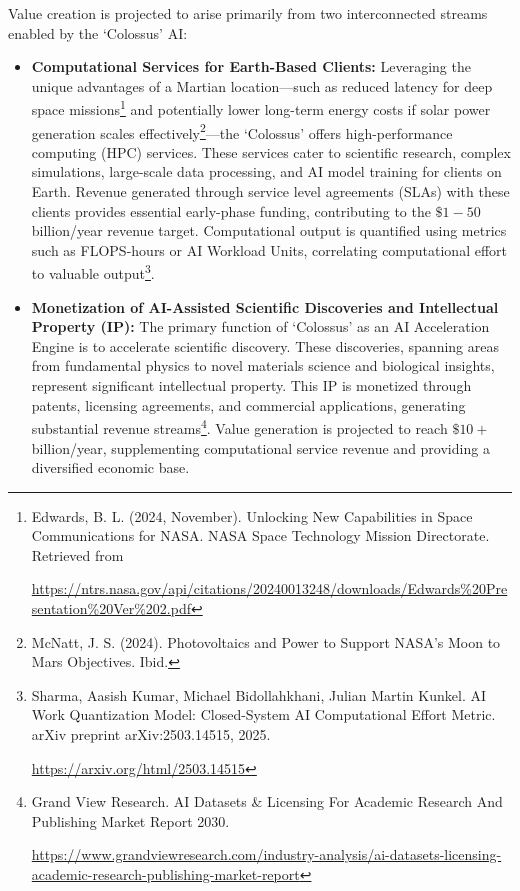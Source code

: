 \documentclass[fontsize=10pt, oneside, DIV=calc]{scrartcl}
\begin{document}
\noindent
Value creation is projected to arise primarily from two interconnected streams enabled by the `Colossus' AI:
\begin{itemize}
    \item \textbf{Computational Services for Earth-Based Clients:} Leveraging the unique advantages of a Martian location---such as reduced latency for deep space missions\footnote{Edwards, B. L. (2024, November). Unlocking New Capabilities in Space Communications for NASA. NASA Space Technology Mission Directorate. Retrieved from 







\href{https://ntrs.nasa.gov/api/citations/20240013248/downloads/Edwards\%20Presentation\_Ver\%202.pdf}\url{https://ntrs.nasa.gov/api/citations/20240013248/downloads/Edwards\%20Presentation\%20Ver\%202.pdf}} and potentially lower long-term energy costs if solar power generation scales effectively\footnote{McNatt, J. S. (2024). Photovoltaics and Power to Support NASA’s Moon to Mars Objectives. Ibid.}---the `Colossus' offers high-performance computing (HPC) services. These services cater to scientific research, complex simulations, large-scale data processing, and AI model training for clients on Earth. Revenue generated through service level agreements (SLAs) with these clients provides essential early-phase funding, contributing to the \( \$1-50 \) billion/year revenue target. Computational output is quantified using metrics such as FLOPS-hours or AI Workload Units, correlating computational effort to valuable output\footnote{Sharma, Aasish Kumar, Michael Bidollahkhani, Julian Martin Kunkel. AI Work Quantization Model: Closed-System AI Computational Effort Metric. arXiv preprint arXiv:2503.14515, 2025. 







\href{https://arxiv.org/html/2503.14515}\url{https://arxiv.org/html/2503.14515}}.
    \item \textbf{Monetization of AI-Assisted Scientific Discoveries and Intellectual Property (IP):} The primary function of `Colossus' as an AI Acceleration Engine is to accelerate scientific discovery. These discoveries, spanning areas from fundamental physics to novel materials science and biological insights, represent significant intellectual property. This IP is monetized through patents, licensing agreements, and commercial applications, generating substantial revenue streams\footnote{Grand View Research. AI Datasets \& Licensing For Academic Research And Publishing Market Report 2030. 







\href{https://www.grandviewresearch.com/industry-analysis/ai-datasets-licensing-academic-research-publishing-market-report}\url{https://www.grandviewresearch.com/industry-analysis/ai-datasets-licensing-academic-research-publishing-market-report}}. Value generation is projected to reach \( \$10+ \) billion/year, supplementing computational service revenue and providing a diversified economic base.
\end{itemize}
\end{document}
